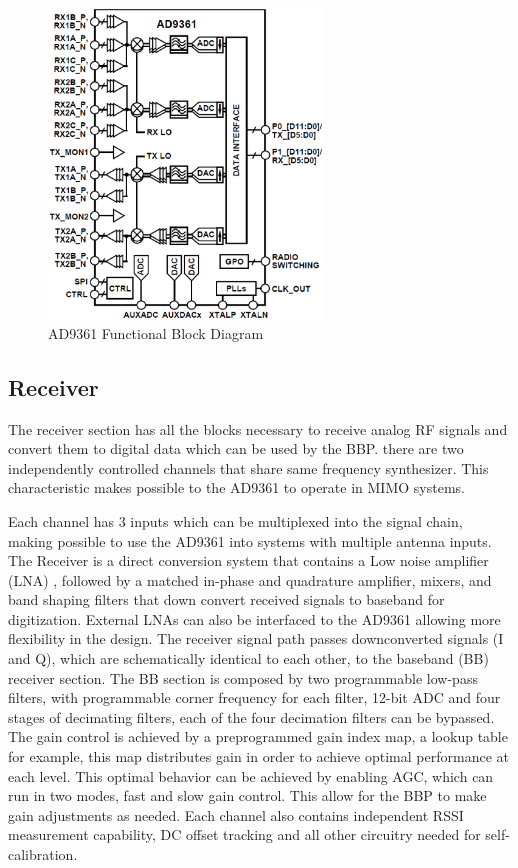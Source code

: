 \begin{figure}[htbp]
    \centering
    \includegraphics[width=0.65\textwidth]{./figures/ad9361_functional_diagram}
    \caption{ AD9361 Functional Block Diagram
    \label{fig:ad9361func}}
\end{figure}

\subsection{Receiver}

The receiver section has all the blocks necessary to receive analog RF signals and convert them to digital data which can be used by the BBP. there are two independently controlled channels that share same frequency synthesizer. This characteristic makes possible to the AD9361 to operate in MIMO systems.

Each channel has 3 inputs which can be multiplexed into the signal chain, making possible to use the AD9361 into systems with multiple antenna inputs. The Receiver is a direct conversion system that contains a Low noise amplifier (LNA) , followed by a matched in-phase and quadrature amplifier, mixers, and band shaping filters that down convert received signals to baseband for digitization. External LNAs can also be interfaced to the AD9361 allowing more flexibility in the design.
The receiver signal path passes downconverted signals (I and Q), which are schematically identical to each other,  to the baseband (BB) receiver section. The BB section is composed by two programmable low-pass filters, with programmable corner frequency for each filter, 12-bit ADC and four stages of decimating filters, each of the four decimation filters can be bypassed. 
The gain control is achieved by a preprogrammed gain index map, a lookup table for example, this map distributes gain in order to achieve optimal performance at each level. This optimal behavior can be achieved by enabling AGC, which can run in two modes, fast and slow gain control. This allow for the BBP to make gain adjustments as needed.
Each channel also contains independent RSSI measurement capability, DC offset tracking and all other circuitry needed for self-calibration.

